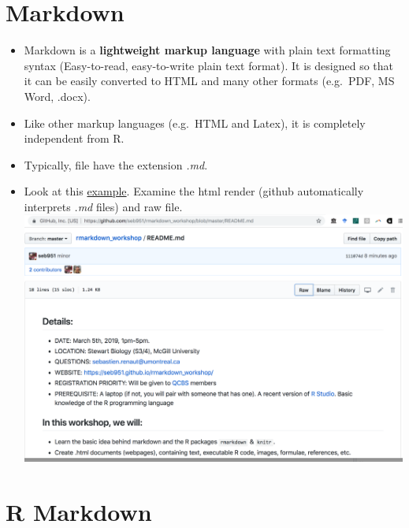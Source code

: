 \documentclass[]{article}
\begin{document}
\hypertarget{markdown}{%
\section{Markdown}\label{markdown}}

\begin{itemize}
\item
  Markdown is a \textbf{lightweight markup language} with plain text
  formatting syntax (Easy-to-read, easy-to-write plain text format). It
  is designed so that it can be easily converted to HTML and many other
  formats (e.g.~PDF, MS Word, .docx).
\item
  Like other markup languages (e.g.~HTML and Latex), it is completely
  independent from R.
\item
  Typically, file have the extension \emph{.md}.
\item
  Look at this
  \href{https://github.com/seb951/rmarkdown_workshop/blob/master/README.md}{example}.
  Examine the html render (github automatically interprets \emph{.md}
  files) and raw file.\\
  \includegraphics[width=5.20833in,height=\textheight]{../figures/md_example.png}
\end{itemize}

\hypertarget{r-markdown}{%
\section{R Markdown}\label{r-markdown}}
\end{document}
